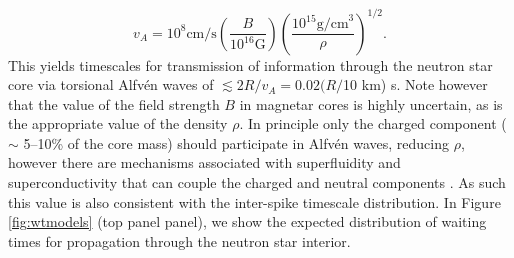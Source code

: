\documentclass[12pt]{emulateapj}
\begin{document}
\begin{equation}
v_A = 10^8 \mathrm{cm/s} \left(\frac{B}{10^{16} \mathrm{G}}\right) \left(\frac{10^{15} \mathrm{g/cm}^3}{\rho}\right)^{1/2}.
\end{equation}
This yields timescales for transmission of information through the neutron star core via torsional Alfv\'en waves of $\lesssim 2R/v_A = 0.02 (R/$10 km) s.
 Note however that the value of the field strength $B$ in magnetar cores is highly uncertain, as is the appropriate value of the density $\rho$. In principle 
 only the charged component ($\sim$ 5--10\% of the core mass) should participate in Alfv\'en waves, reducing $\rho$, however there are mechanisms 
 associated with superfluidity and superconductivity that can couple the charged and neutral components \citep{vanhoven2008,andersson2009}. As such this value is also consistent with the 
 inter-spike timescale distribution. In Figure \ref{fig:wtmodels} (top panel panel), we show the expected distribution of waiting times for propagation through 
 the neutron star interior. 
\end{document}
